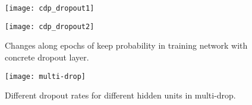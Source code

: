 \begin{figure}[h!]
	\begin{center}
		\texttt{[image: cdp\_dropout1]}	
		\label{fig:cdp_dropout1}
	\end{center}
\end{figure}

\begin{figure}[h!]
	\begin{center}
		\texttt{[image: cdp\_dropout2]}	
		\label{fig:cdp_dropout2}
		\caption{Changes along epochs of keep probability in training network with concrete dropout layer.}
	\end{center}
\end{figure}

\begin{figure}[h!]
	\begin{center}
		\centering
		\texttt{[image: multi-drop]}
		\caption{Different dropout rates for different hidden units in multi-drop.}		
		\label{fig:multi-drop}
	\end{center}
\end{figure}

\newpage
